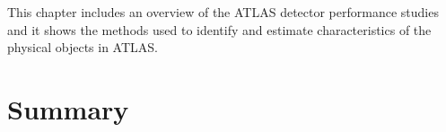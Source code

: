 
This chapter includes an overview of the ATLAS detector performance studies and it shows
the methods used to identify and estimate characteristics of the physical objects in ATLAS.

\section{Summary}
